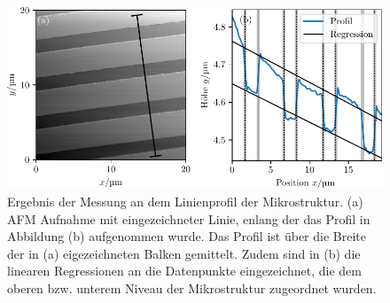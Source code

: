 \begin{figure}
  \centering
  \includegraphics[scale = 1]{../analysis/data/nanostruktur_linien/linien_profil.pdf}
  \caption{Ergebnis der Messung an dem Linienprofil der Mikrostruktur. (a) AFM Aufnahme mit eingezeichneter
  Linie, enlang der das Profil in Abbildung (b) aufgenommen wurde. Das Profil ist
  über die Breite der in (a) eigezeichneten Balken gemittelt. Zudem sind in (b) die linearen Regressionen
  an die Datenpunkte eingezeichnet, die dem oberen bzw. unterem Niveau der Mikrostruktur zugeordnet wurden.}
  \label{fig: linien_profil}
\end{figure}


